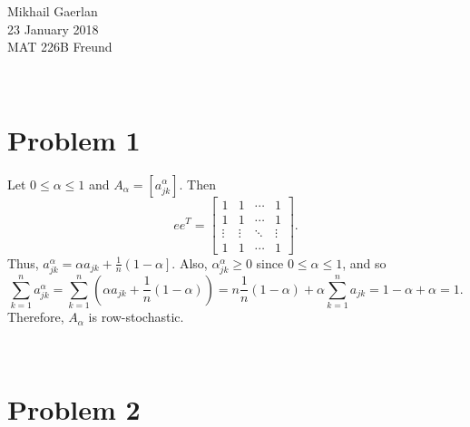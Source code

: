 \documentclass[11pt]{article}
\theoremstyle{definition}
\theoremstyle{remark}
\newcommand{\newquestion}{\hrulefill\vspace{-0.8\baselineskip}\\\null\hrulefill\vspace{-1.0\baselineskip}}
\theoremstyle{plain}
\begin{document}
  \begin{flushright}
    Mikhail Gaerlan\\
    23 January 2018\\
    MAT 226B Freund
  \end{flushright}
\vspace{-1.3\baselineskip}
\newquestion
%
%
\section*{Problem 1}
Let $0\leq\alpha\leq1$ and $A_\alpha=\left[a_{jk}^\alpha\right]$. Then
\begin{equation*}
  ee^{T}=\left[
    \begin{array}{cccc}
      1 & 1 & \cdots & 1\\
      1 & 1 & \cdots & 1\\
      \vdots & \vdots & \ddots & \vdots\\
      1 & 1 & \cdots & 1
    \end{array}
  \right].
\end{equation*}
Thus, $a_{jk}^\alpha=\alpha a_{jk}+\frac{1}{n}\left(1-\alpha\right]$. Also, $\alpha_{jk}^\alpha\geq0$ since $0\leq\alpha\leq1$, and so
\begin{equation*}
  \sum_{k=1}^na_{jk}^\alpha=\sum_{k=1}^n\left(\alpha a_{jk}+\frac{1}{n}\left(1-\alpha\right)\right)=n\frac{1}{n}\left(1-\alpha\right)+\alpha\sum_{k=1}^na_{jk}=1-\alpha+\alpha=1.
\end{equation*}
Therefore, $A_\alpha$ is row-stochastic.

\newquestion
%
%
\section*{Problem 2}
\end{document}
